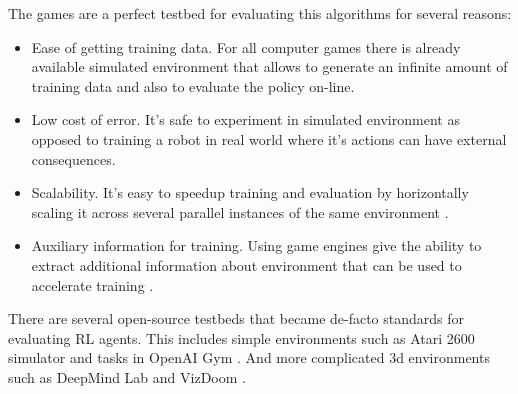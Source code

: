 
The games are a perfect testbed for evaluating this algorithms for several reasons:
\begin{itemize}
    \item Ease of getting training data. For all computer games there is already available simulated environment that allows to generate an infinite amount of training data and also to evaluate the policy on-line.
    \item Low cost of error. It's safe to experiment in simulated environment as opposed to training a robot in real world where it's actions can have external consequences. 
    \item Scalability. It's easy to speedup training and evaluation by horizontally scaling it across several parallel instances of the same environment \cite{Gorila}.
    \item Auxiliary information for training. Using game engines give the ability to extract additional information about environment that can be used to accelerate training \cite{UNREAL}.
\end{itemize}

There are several open-source testbeds that became de-facto standards for evaluating RL agents.
This includes simple environments such as Atari 2600 simulator \cite{bellemare13arcade} and tasks in OpenAI Gym \cite{OpenAIGym}.
And more complicated 3d environments such as DeepMind Lab \cite{DeepMindLab} and VizDoom \cite{Kempka2016ViZDoom}.




